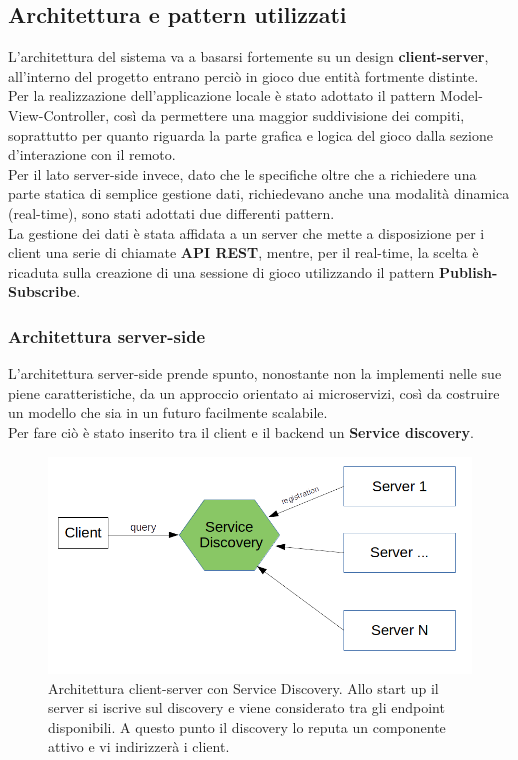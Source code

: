         \subsection[Architettura]{Architettura e pattern utilizzati}\label{subsec:architecture}
         L'architettura del sistema va a basarsi fortemente su un design \textbf{client-server}, all'interno del progetto entrano perciò in gioco due entità fortmente distinte. \\ Per la realizzazione dell'applicazione locale è stato adottato il pattern Model-View-Controller, così da permettere una maggior suddivisione dei compiti, soprattutto per quanto riguarda la parte grafica e logica del gioco dalla sezione d'interazione con il remoto.  \\
        Per il lato server-side invece, dato che le specifiche oltre che a richiedere una parte statica di semplice gestione dati, richiedevano anche una modalità dinamica (real-time), sono stati adottati due differenti pattern.
        \\
        La gestione dei dati è stata affidata a un server che mette a disposizione per i client una serie di chiamate \textbf{API REST}, mentre, per il real-time, la scelta è ricaduta sulla creazione di una sessione di gioco utilizzando il pattern \textbf{Publish-Subscribe}.


            \subsubsection{Architettura server-side}\label{subsub:architecture:server}
            L'architettura server-side prende spunto, nonostante non la implementi nelle sue piene caratteristiche, da un approccio orientato ai microservizi, così da costruire un modello che sia in un futuro facilmente scalabile. \\

            Per fare ciò è stato inserito tra il client e il backend un \textbf{Service discovery}.

            \begin{figure}[h!]
                \includegraphics[scale=0.6]{images/ArchitetturaDiscovery.png}
                \caption{Architettura client-server con Service Discovery. Allo start up il server si iscrive sul discovery e viene considerato tra gli endpoint disponibili. A questo punto il discovery lo reputa un componente attivo e vi indirizzerà i client.}
            \end{figure}

